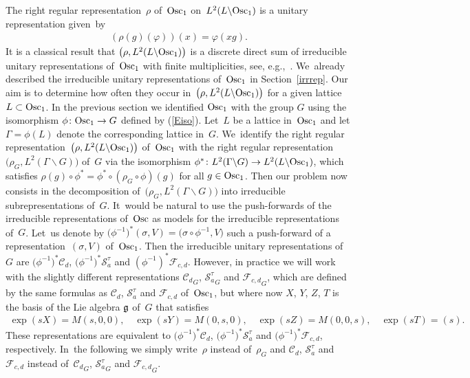 \documentclass[pdftex]{sigma}
\newcommand\cC{{\mathcal C}}
\newcommand{\Osc}{{\rm Osc}}
\numberwithin{equation}{section}
\begin{document}
The right regular representation~$\rho$ of~$\Osc_1$ on~$L^2(L\backslash \Osc_1)$ is a unitary representation given~by
\begin{gather*}
(\rho(g)(\varphi))(x)=\varphi(xg).
\end{gather*}
It is a classical result that $\big(\rho,L^2(L\backslash\Osc_1)\big)$ is a discrete direct sum of irreducible unitary representations of~$\Osc_1$ with finite multiplicities, see, e.g.,~\cite{Wo07}. We~already described the irreducible unitary representations of~$\Osc_1$ in Section~\ref{irrrep}. Our aim is to determine how often they occur in~$\big(\rho,L^2(L\backslash\Osc_1)\big)$ for a given lattice $L\subset \Osc_1$.
%
In the previous section we identified $\Osc_1$ with the group $G$ using the isomorphism $\phi\colon \Osc_1\rightarrow G$ defined by (\ref{Eiso}). Let~$L$ be a lattice in~$\Osc_1$ and let $\Gamma=\phi(L)$ denote the corresponding lattice in~$G$. We~identify the right regular representation~$\big(\rho, L^2(L\backslash\Osc_1)\big)$ of~$\Osc_1$ with the right regular representation~$\big(\rho_G, L^2(\Gamma\backslash G)\big)$ of~$G$ via the isomorphism $\phi^*\colon L^2(\Gamma\backslash G)\rightarrow L^2(L\backslash\Osc_1)$, which satisfies $\rho(g)\circ\phi^*=\phi^*\circ(\rho_G\circ\phi)(g)$ for all $g\in\Osc_1$. Then our problem now consists in the decomposition of~$\big(\rho_G, L^2(\Gamma\backslash G)\big)$ into irreducible subrepresentations of~$G$. It~would be natural to use the push-forwards of the irreducible representations of~$\Osc$ as models for the irreducible representations of~$G$. Let~us denote by $\big(\phi^{-1}\big)^*(\sigma,V)=\big(\sigma\circ\phi^{-1},V\big)$ such a push-forward of a representation~$(\sigma,V)$ of~$\Osc_1$. Then the irreducible unitary representations of~$G$ are $\big(\phi^{-1}\big)^*\cC_d$, $\big(\phi^{-1}\big)^*{\mathcal S}^\tau_a$ and $(\phi^{-1})^*{\mathcal F}_{c,d}$. However, in practice we will work with the slightly different representations ${\cC_d}_G$, ${{\mathcal S}^\tau_a}_G$ and ${{\mathcal F}_{c,d}}_G$, which are defined by the same formulas as $\cC_d$, ${\mathcal S}^\tau_a$ and ${\mathcal F}_{c,d}$ of~$\Osc_1$, but where now $X$, $Y$, $Z$, $T$ is the basis of the Lie algebra $\frak g$ of~$G$ that satisfies
\begin{gather*}
\exp(sX)=M(s,0,0),\quad \exp(sY)=M(0,s,0),\quad \exp(sZ)=M(0,0,s) ,\quad \exp(sT)=(s).
\end{gather*}
These representations are equivalent to $\big(\phi^{-1}\big)^*\cC_d$, $\big(\phi^{-1}\big)^*{\mathcal S}^\tau_a$ and $\big(\phi^{-1}\big)^*{\mathcal F}_{c,d}$, respectively. In~the following we simply write~$\rho$ instead of~$\rho_G$ and $\cC_d$, ${\mathcal S}^\tau_a$ and ${\mathcal F}_{c,d}$ instead of~${\cC_d}_G$, ${{\mathcal S}^\tau_a}_G$ and ${{\mathcal F}_{c,d}}_G$.
\end{document}
